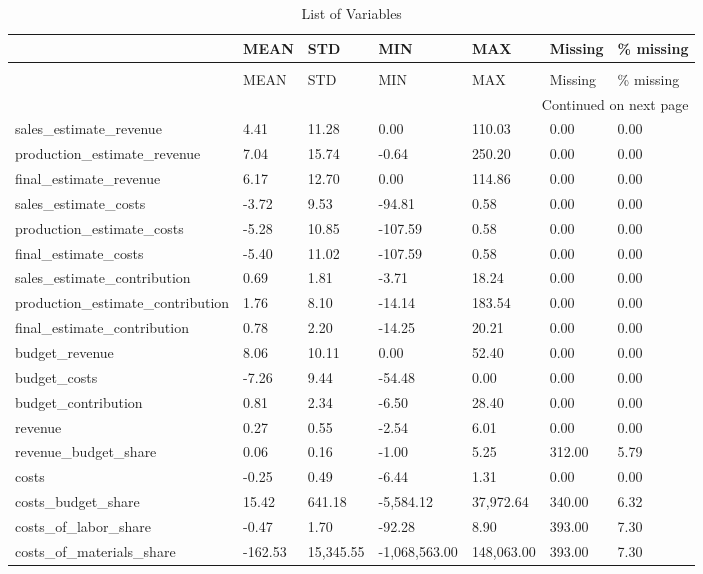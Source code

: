 \begin{landscape}\begin{longtable}[h!]{lllllll}
\caption{List of Variables} \label{eda_1} \\
\toprule
 & MEAN & STD & MIN & MAX & Missing & \% missing \\
\midrule
\endfirsthead
\caption[]{List of Variables} \\
\toprule
 & MEAN & STD & MIN & MAX & Missing & \% missing \\
\midrule
\endhead
\midrule
\multicolumn{7}{r}{Continued on next page} \\
\midrule
\endfoot
\bottomrule
\endlastfoot
sales_estimate_revenue & 4.41 & 11.28 & 0.00 & 110.03 & 0.00 & 0.00 \\
production_estimate_revenue & 7.04 & 15.74 & -0.64 & 250.20 & 0.00 & 0.00 \\
final_estimate_revenue & 6.17 & 12.70 & 0.00 & 114.86 & 0.00 & 0.00 \\
sales_estimate_costs & -3.72 & 9.53 & -94.81 & 0.58 & 0.00 & 0.00 \\
production_estimate_costs & -5.28 & 10.85 & -107.59 & 0.58 & 0.00 & 0.00 \\
final_estimate_costs & -5.40 & 11.02 & -107.59 & 0.58 & 0.00 & 0.00 \\
sales_estimate_contribution & 0.69 & 1.81 & -3.71 & 18.24 & 0.00 & 0.00 \\
production_estimate_contribution & 1.76 & 8.10 & -14.14 & 183.54 & 0.00 & 0.00 \\
final_estimate_contribution & 0.78 & 2.20 & -14.25 & 20.21 & 0.00 & 0.00 \\
budget_revenue & 8.06 & 10.11 & 0.00 & 52.40 & 0.00 & 0.00 \\
budget_costs & -7.26 & 9.44 & -54.48 & 0.00 & 0.00 & 0.00 \\
budget_contribution & 0.81 & 2.34 & -6.50 & 28.40 & 0.00 & 0.00 \\
revenue & 0.27 & 0.55 & -2.54 & 6.01 & 0.00 & 0.00 \\
revenue_budget_share & 0.06 & 0.16 & -1.00 & 5.25 & 312.00 & 5.79 \\
costs & -0.25 & 0.49 & -6.44 & 1.31 & 0.00 & 0.00 \\
costs_budget_share & 15.42 & 641.18 & -5,584.12 & 37,972.64 & 340.00 & 6.32 \\
costs_of_labor_share & -0.47 & 1.70 & -92.28 & 8.90 & 393.00 & 7.30 \\
costs_of_materials_share & -162.53 & 15,345.55 & -1,068,563.00 & 148,063.00 & 393.00 & 7.30 \\

\end{longtable}
\end{landscape}
